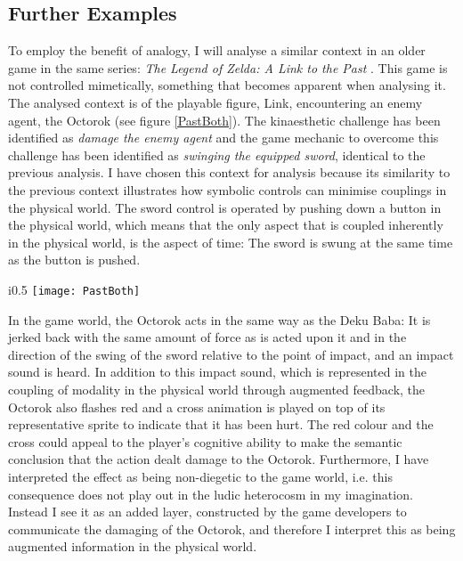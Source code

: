 \subsection{Further Examples}
To employ the benefit of analogy, I will analyse a similar context in an older game in the same series: \textit{The Legend of Zelda: A Link to the Past} \cite{linktothepast}. This game is not controlled mimetically, something that becomes apparent when analysing it. The analysed context is of the playable figure, Link, encountering an enemy agent, the Octorok (see figure \ref{PastBoth}). The kinaesthetic challenge has been identified as \textit{damage the enemy agent} and the game mechanic to overcome this challenge has been identified as \textit{swinging the equipped sword}, identical to the previous analysis. I have chosen this context for analysis because its similarity to the previous context illustrates how symbolic controls can minimise couplings in the physical world. The sword control is operated by pushing down a button in the physical world, which means that the only aspect that is coupled inherently in the physical world, is the aspect of time: The sword is swung at the same time as the button is pushed.

\begin{wrapfigure}{i}{0.5\textwidth}
  \texttt{[image: PastBoth]}
  \caption{Damaging the Octorok by swinging the sword in The Legend of Zelda: A Link to the Past as analysed through the game mechanic focus and the challenge focus interpretations combined}
  \label{PastBoth}
\end{wrapfigure}

In the game world, the Octorok acts in the same way as the Deku Baba: It is jerked back with the same amount of force as is acted upon it and in the direction of the swing of the sword relative to the point of impact, and an impact sound is heard. In addition to this impact sound, which is represented in the coupling of modality in the physical world through augmented feedback, the Octorok also flashes red and a cross animation is played on top of its representative sprite to indicate that it has been hurt. The red colour and the cross could appeal to the player's cognitive ability to make the semantic conclusion that the action dealt damage to the Octorok. Furthermore, I have interpreted the effect as being non-diegetic to the game world, i.e. this consequence does not play out in the ludic heterocosm in my imagination. Instead I see it as an added layer, constructed by the game developers to communicate the damaging of the Octorok, and therefore I interpret this as being augmented information in the physical world.

